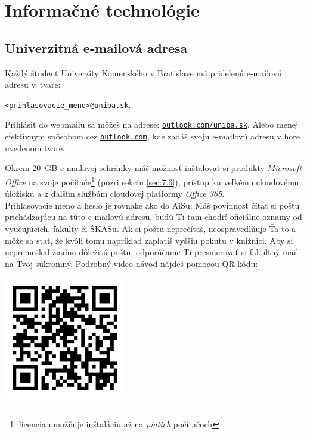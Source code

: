 \chapter{Informačné technológie}

\section{Univerzitná e-mailová adresa} \label{sec:6.1}

Každý študent Univerzity Komenského v Bratislave má pridelenú e-mailovú
adresu v~tvare:

\begin{center}
\texttt{<prihlasovacie\_meno>@uniba.sk}.
\end{center}

\noindent
Prihlásiť do webmailu sa môžeš na adrese: \href{https://www.outlook.com/uniba.sk}{\texttt{outlook.com/uniba.sk}}. Alebo menej efektívnym spôsobom cez \href{https://www.outlook.com}{\texttt{outlook.com}}, kde zadáš svoju e-mailovú adresu v hore uvedenom tvare.

Okrem 20~GB e-mailovej schránky máš možnosť inštalovať si produkty \emph{Microsoft Office} na svoje počítače\footnote{licencia umožňuje inštaláciu až na \emph{piatich} počítačoch} (pozri sekciu \ref{sec:7.6}), prístup ku veľkému cloudovému úložisku a k ďalším službám cloudovej platformy \emph{Office 365}. \\

Prihlasovacie meno a heslo je rovnaké ako do AiSu. Máš povinnosť čítať si poštu prichádzajúcu na túto e-mailovú adresu, budú Ti tam chodiť oficiálne oznamy od vyučujúcich, fakulty či ŠKASu. Ak si poštu neprečítaš, neospravedlňuje Ťa to a môže sa stať, že kvôli tomu napríklad zaplatíš vyššiu pokutu v knižnici. Aby si nepremeškal žiadnu dôležitú poštu, odporúčame Ti presmerovať si fakultný mail na Tvoj súkromný. Podrobný video návod nájdeš pomocou QR kódu: 

%

\begin{center}
	\includegraphics[width=0.4\textwidth]{obrazky/qr_code_IT.png}
	\par\end{center} 

